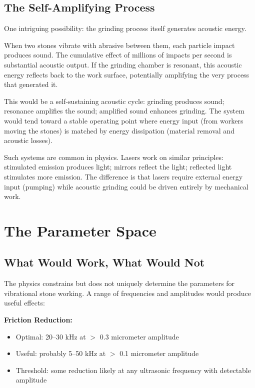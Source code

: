 \documentclass[11pt]{article}
\begin{document}
\subsection{The Self-Amplifying Process}

One intriguing possibility: the grinding process itself generates acoustic energy.

When two stones vibrate with abrasive between them, each particle impact produces sound. The cumulative effect of millions of impacts per second is substantial acoustic output. If the grinding chamber is resonant, this acoustic energy reflects back to the work surface, potentially amplifying the very process that generated it.

This would be a self-sustaining acoustic cycle: grinding produces sound; resonance amplifies the sound; amplified sound enhances grinding. The system would tend toward a stable operating point where energy input (from workers moving the stones) is matched by energy dissipation (material removal and acoustic losses).

Such systems are common in physics. Lasers work on similar principles: stimulated emission produces light; mirrors reflect the light; reflected light stimulates more emission. The difference is that lasers require external energy input (pumping) while acoustic grinding could be driven entirely by mechanical work.

\section{The Parameter Space}

\subsection{What Would Work, What Would Not}

The physics constrains but does not uniquely determine the parameters for vibrational stone working. A range of frequencies and amplitudes would produce useful effects:

\textbf{Friction Reduction:}
\begin{itemize}
    \item Optimal: 20--30 kHz at $>$ 0.3 micrometer amplitude
    \item Useful: probably 5--50 kHz at $>$ 0.1 micrometer amplitude
    \item Threshold: some reduction likely at any ultrasonic frequency with detectable amplitude
\end{itemize}
\end{document}

